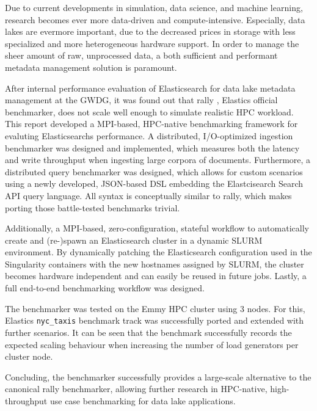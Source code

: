 Due to current developments in simulation, data science, and machine learning, research becomes ever more data-driven and compute-intensive. Especially, data lakes are evermore important, due to the decreased prices in storage with less specialized and more heterogeneous hardware support. In order to manage the sheer amount of raw, unprocessed data, a both sufficient and performant metadata management solution is paramount.

After internal performance evaluation of Elasticsearch for data lake metadata management at the GWDG, it was found out that rally \cite{rally}, Elastics official benchmarker, does not scale well enough to simulate realistic \ac{HPC} workload. This report developed a \acs{MPI}-based, \acs{HPC}-native benchmarking framework for evaluting Elasticsearchs performance. A distributed, I/O-optimized ingestion benchmarker was designed and implemented, which measures both the latency and write throughput when ingesting large corpora of documents. Furthermore, a distributed query benchmarker was designed, which allows for custom scenarios using a newly developed, \acs{JSON}-based \ac{DSL} embedding the Elastcisearch Search \acs{API} query language. All syntax is conceptually similar to rally, which makes porting those battle-tested benchmarks trivial.

Additionally, a \acs{MPI}-based, zero-configuration, stateful workflow to automatically create and (re-)spawn an Elasticsearch cluster in a dynamic \acs{SLURM} environment. By dynamically patching the Elasticsearch configuration used in the Singularity containers with the new hostnames assigned by SLURM, the cluster becomes hardware independent and can easily be reused in future jobs. Lastly, a full end-to-end benchmarking workflow was designed.

The benchmarker was tested on the Emmy \acs{HPC} cluster using 3 nodes. For this, Elastics \texttt{nyc\_taxis} benchmark track was successfully ported and extended with further scenarios. It can be seen that the benchmark successfully records the expected scaling behaviour when increasing the number of load generators per cluster node.

Concluding, the benchmarker successfully provides a large-scale alternative to the canonical rally benchmarker, allowing further research in \ac{HPC}-native, high-throughput use case benchmarking for data lake applications.
